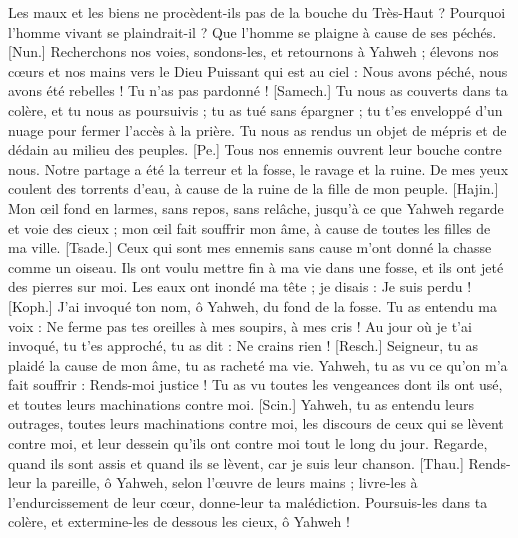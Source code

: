 \begin{multicols}{2}
Les maux et les biens ne procèdent-ils pas de la bouche du Très-Haut ?
Pourquoi l’homme vivant se plaindrait-il ? Que l’homme se plaigne à cause de ses péchés.
[Nun.] Recherchons nos voies, sondons-les, et retournons à Yahweh ;
élevons nos cœurs et nos mains vers le Dieu Puissant qui est au ciel :
Nous avons péché, nous avons été rebelles ! Tu n’as pas pardonné !
[Samech.] Tu nous as couverts dans ta colère, et tu nous as poursuivis ; tu as tué sans épargner ;
tu t’es enveloppé d'un nuage pour fermer l’accès à la prière.
Tu nous as rendus un objet de mépris et de dédain au milieu des peuples.
[Pe.] Tous nos ennemis ouvrent leur bouche contre nous.
Notre partage a été la terreur et la fosse, le ravage et la ruine.
De mes yeux coulent des torrents d’eau, à cause de la ruine de la fille de mon peuple.
[Hajin.] Mon œil fond en larmes, sans repos, sans relâche,
jusqu’à ce que Yahweh regarde et voie des cieux ;
mon œil fait souffrir mon âme, à cause de toutes les filles de ma ville.
[Tsade.] Ceux qui sont mes ennemis sans cause m’ont donné la chasse comme un oiseau.
Ils ont voulu mettre fin à ma vie dans une fosse, et ils ont jeté des pierres sur moi.
Les eaux ont inondé ma tête ; je disais : Je suis perdu !
[Koph.] J’ai invoqué ton nom, ô Yahweh, du fond de la fosse.
Tu as entendu ma voix : Ne ferme pas tes oreilles à mes soupirs, à mes cris !
Au jour où je t’ai invoqué, tu t'es approché, tu as dit : Ne crains rien !
[Resch.] Seigneur, tu as plaidé la cause de mon âme, tu as racheté ma vie.
Yahweh, tu as vu ce qu’on m'a fait souffrir : Rends-moi justice !
Tu as vu toutes les vengeances dont ils ont usé, et toutes leurs machinations contre moi.
[Scin.] Yahweh, tu as entendu leurs outrages, toutes leurs machinations contre moi,
les discours de ceux qui se lèvent contre moi, et leur dessein qu'ils  ont contre moi tout le long du jour.
Regarde, quand ils sont assis et quand ils se lèvent, car je suis leur chanson.
[Thau.] Rends-leur la pareille, ô Yahweh, selon l’œuvre de leurs mains ;
livre-les à l'endurcissement de leur cœur, donne-leur ta malédiction.
Poursuis-les dans ta colère, et extermine-les de dessous les cieux, ô Yahweh !

\end{multicols}
